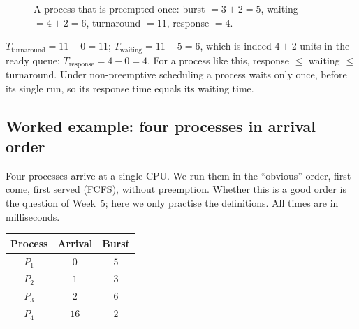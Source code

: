 \documentclass[11pt,a4paper]{article}
\begin{document}
\begin{figure}[H]
\centering
{}
\caption{A process that is preempted once: burst $=3+2=5$, waiting $=4+2=6$, turnaround $=11$, response $=4$.}
\end{figure}

\begin{example}
$T_{\text{turnaround}} = 11 - 0 = 11$; $T_{\text{waiting}} = 11 - 5 = 6$, which is indeed $4 + 2$ units in the ready queue; $T_{\text{response}} = 4 - 0 = 4$. For a process like this, response $\le$ waiting $\le$ turnaround. Under non-preemptive scheduling a process waits only once, before its single run, so its response time equals its waiting time.
\end{example}

\subsection{Worked example: four processes in arrival order}

Four processes arrive at a single CPU. We run them in the ``obvious'' order, first come, first served (FCFS), without preemption. Whether this is a good order is the question of Week~5; here we only practise the definitions. All times are in milliseconds.

\begin{center}
\renewcommand{\arraystretch}{1.2}
\begin{tabular}{@{}ccc@{}}
\toprule
\textbf{Process} & \textbf{Arrival} & \textbf{Burst} \\
\midrule
$P_1$ & $0$ & $5$ \\
$P_2$ & $1$ & $3$ \\
$P_3$ & $2$ & $6$ \\
$P_4$ & $16$ & $2$ \\
\bottomrule
\end{tabular}
\end{center}
\end{document}
